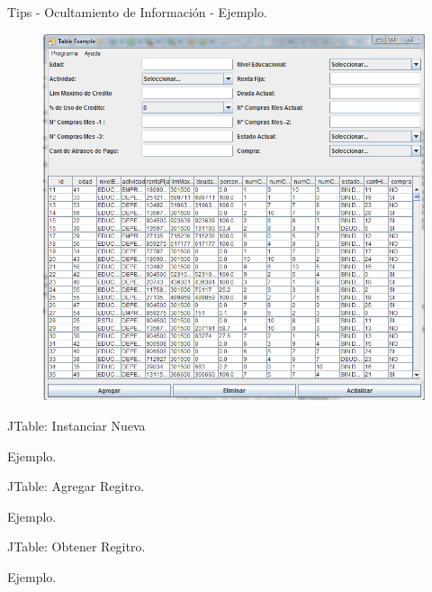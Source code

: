 \begin{frame}{Tips - Ocultamiento de Informaci\'on - Ejemplo.}
  \begin{figure}
    \includegraphics[scale=0.3]{figuras/DT.PNG}
  \end{figure}
\end{frame}

\begin{frame}{JTable: Instanciar Nueva}
\begin{block}{Ejemplo.}
	
\end{block}
\end{frame}

\begin{frame}{JTable: Agregar Regitro.}
\begin{block}{Ejemplo.}
	
\end{block}
\end{frame}

\begin{frame}{JTable: Obtener Regitro.}
\begin{block}{Ejemplo.}
	
\end{block}
\end{frame}

%
